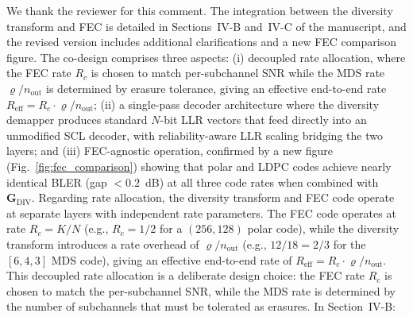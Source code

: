 We thank the reviewer for this comment. The integration between the diversity transform and FEC is detailed in Sections~IV-B and~IV-C of the manuscript, and the revised version includes additional clarifications and a new FEC comparison figure. The co-design comprises three aspects: (i) decoupled rate allocation, where the FEC rate $R_c$ is chosen to match per-subchannel SNR while the MDS rate $\varrho/n_{\mathrm{out}}$ is determined by erasure tolerance, giving an effective end-to-end rate $R_{\mathrm{eff}} = R_c \cdot \varrho/n_{\mathrm{out}}$; (ii) a single-pass decoder architecture where the diversity demapper produces standard $N$-bit LLR vectors that feed directly into an unmodified SCL decoder, with reliability-aware LLR scaling bridging the two layers; and (iii) FEC-agnostic operation, confirmed by a new figure (Fig.~\ref{fig:fec_comparison}) showing that polar and LDPC codes achieve nearly identical BLER (gap $< 0.2$~dB) at all three code rates when combined with $\mathbf{G}_{\mathrm{DIV}}$. Regarding rate allocation, the diversity transform and FEC code operate at separate layers with independent rate parameters. The FEC code operates at rate $R_c = K/N$ (e.g., $R_c = 1/2$ for a $(256,128)$ polar code), while the diversity transform introduces a rate overhead of $\varrho/n_{\mathrm{out}}$ (e.g., $12/18 = 2/3$ for the $[6,4,3]$ MDS code), giving an effective end-to-end rate of $R_{\mathrm{eff}} = R_c \cdot \varrho/n_{\mathrm{out}}$. This decoupled rate allocation is a deliberate design choice: the FEC rate $R_c$ is chosen to match the per-subchannel SNR, while the MDS rate is determined by the number of subchannels that must be tolerated as erasures. In Section~IV-B:

